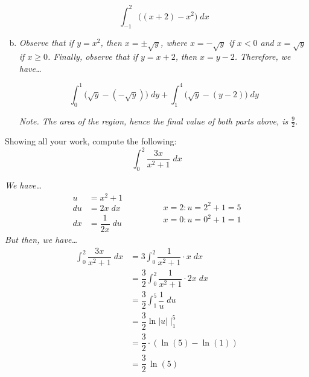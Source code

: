 \documentclass[12pt,letterpaper]{exam}
\begin{document}
\begin{questions}
\begin{enumerate}[(a)]
	\[
	\int_{-1}^2 \big( (x + 2) - x^2 \big) \;dx
	\] \par\vspace{1.1cm}\vfill
	
\item {} \vfill

{\itshape Observe that if $y= x^2$, then $x= \pm \sqrt{y}$, where $x= -\sqrt{y}$ if $x < 0$ and $x= \sqrt{y}$ if $x \geq 0$. Finally, observe that if $y= x + 2$, then $x= y - 2$. Therefore, we have\dots} \par\vspace{0.75cm}

	\[
	\int_0^1 \big( \sqrt{y} - (-\sqrt{y}) \big) \;dy + \int_1^4 \big( \sqrt{y} - (y - 2) \big) \;dy
	\] \vfill

{\itshape \scriptsize Note. The area of the region, hence the final value of both parts above, is $\frac{9}{2}$.}
\end{enumerate}



\newpage
\question[10] Showing all your work, compute the following:
	\[
	\int_0^2 \dfrac{3x}{x^2 + 1} \;dx
	\] \pspace

{\itshape \tsol We have\dots
	\[
	\begin{aligned}
	u&= x^2 + 1 \\[0.4cm]
	du&= 2x \;dx \\
	dx&= \dfrac{1}{2x} \;du
	\end{aligned}
	\qquad\qquad
	\begin{aligned}
	x=2 \colon u= 2^2 + 1= 5 \\
	x=0 \colon u= 0^2 + 1= 1
	\end{aligned}
	\]
But then, we have\dots
	\[
	\begin{aligned}
	\int_0^2 \dfrac{3x}{x^2 + 1} \;dx&= 3 \int_0^2 \dfrac{1}{x^2 + 1} \cdot x\; dx \\[0.3cm]
	&= \dfrac{3}{2} \int_0^2 \dfrac{1}{x^2 + 1} \cdot 2x\; dx \\[0.3cm] 
	&= \dfrac{3}{2} \int_1^5 \dfrac{1}{u} \;du \\[0.3cm]
	&= \dfrac{3}{2} \ln|u| \;\bigg|_1^5 \\[0.3cm]
	&= \dfrac{3}{2} \cdot \left( \ln(5) - \ln(1) \right) \\[0.3cm]
	&= \dfrac{3}{2} \, \ln(5) 
	\end{aligned}
	\] \vfill

}
\end{questions}
\end{document}
